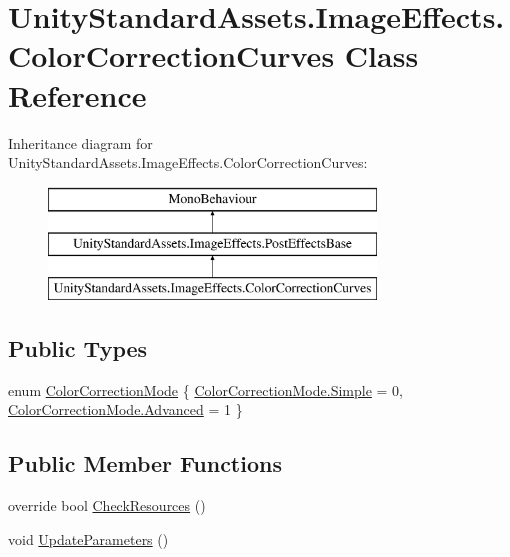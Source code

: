 \hypertarget{class_unity_standard_assets_1_1_image_effects_1_1_color_correction_curves}{}\section{Unity\+Standard\+Assets.\+Image\+Effects.\+Color\+Correction\+Curves Class Reference}
\label{class_unity_standard_assets_1_1_image_effects_1_1_color_correction_curves}
Inheritance diagram for Unity\+Standard\+Assets.\+Image\+Effects.\+Color\+Correction\+Curves\+:\begin{figure}[H]
\begin{center}
\leavevmode
\includegraphics[height=3.000000cm]{class_unity_standard_assets_1_1_image_effects_1_1_color_correction_curves}
\end{center}
\end{figure}
\subsection*{Public Types}
\begin{DoxyCompactItemize}
\item 
enum \mbox{\hyperlink{class_unity_standard_assets_1_1_image_effects_1_1_color_correction_curves_a55501502c323a852330042c44d4530ad}{Color\+Correction\+Mode}} \{ \mbox{\hyperlink{class_unity_standard_assets_1_1_image_effects_1_1_color_correction_curves_a55501502c323a852330042c44d4530ada1fbb1e3943c2c6c560247ac8f9289780}{Color\+Correction\+Mode.\+Simple}} = 0, 
\mbox{\hyperlink{class_unity_standard_assets_1_1_image_effects_1_1_color_correction_curves_a55501502c323a852330042c44d4530ada9b6545e4cea9b4ad4979d41bb9170e2b}{Color\+Correction\+Mode.\+Advanced}} = 1
 \}
\end{DoxyCompactItemize}
\subsection*{Public Member Functions}
\begin{DoxyCompactItemize}
\item 
override bool \mbox{\hyperlink{class_unity_standard_assets_1_1_image_effects_1_1_color_correction_curves_a502331f270ce998ece3592ca9ad0c156}{Check\+Resources}} ()
\item 
void \mbox{\hyperlink{class_unity_standard_assets_1_1_image_effects_1_1_color_correction_curves_a0f3ebb6bb3c2db6c465e6b9701b997d4}{Update\+Parameters}} ()
\end{DoxyCompactItemize}
